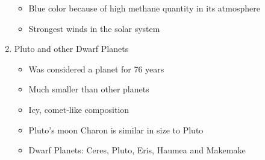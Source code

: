 \documentclass[12pt]{article}
\begin{document}
\begin{enumerate}
\begin{itemize}
\item Blue color because of high methane quantity in its atmosphere
\item Strongest winds in the solar system \end{itemize} 
\item Pluto and other Dwarf Planets \begin{itemize} 
\item Was considered a planet for 76 years 
\item Much smaller than other planets 
\item Icy, comet-like composition
\item Pluto's moon Charon is similar in size to Pluto 
\item Dwarf Planets: Ceres, Pluto, Eris, Haumea and Makemake \end{itemize} \end{enumerate} 
\end{document}

